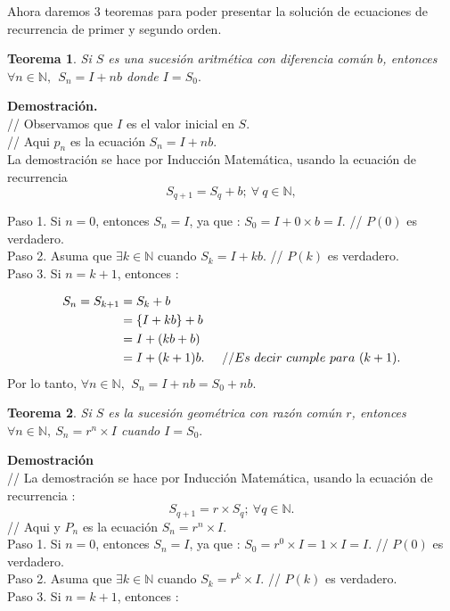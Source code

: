 \documentclass[11pt,a4paper]{article}
\newtheorem{teo}{Teorema}{}
\begin{document}
Ahora daremos 3 teoremas para poder presentar la solución de ecuaciones de recurrencia de primer y segundo orden.\\
\begin{teo}
Si $S$ es una sucesión aritmética con diferencia común $b$, entonces $\forall n \in \mathbb{N},~~ S_{n} = I +nb$ donde $I = S_{0}.$
\end{teo}
\textbf{Demostración.}\\
// Observamos que $I$ es el valor inicial en $S$.\\
// Aqui $p_{n}$ es la ecuación $S_{n} = I + nb.$\\

La demostración se hace por Inducción Matemática, usando la ecuación de recurrencia $$S_{q+1} = S_{q} + b; ~ \forall ~q \in \mathbb{N},$$

Paso 1. Si $n = 0$, entonces $S_{n} = I$, ya que : $S_{0} = I + 0 \times b = I.$ \hspace*{1cm} // $P(0)$ es verdadero.\\
\hspace*{0.5cm} Paso 2. Asuma que $\exists k \in \mathbb{N}$ cuando $S_{k} = I + kb.$ \hspace*{3,4cm} // $P(k)$ es verdadero.\\
\hspace*{0.5cm} Paso 3. Si $n = k + 1$, entonces : 

\begin{align*}
S_{n} = S_{k+1} &= S_{k} + b \\
				&= \{I + kb\} + b \\
				&= I +(kb +b)\\
				&= I +(k+1)b. \hspace{0.5cm} //Es~ decir ~cumple ~para~ (k+1).
\end{align*}
Por lo tanto, $\forall n \in \mathbb{N}$, $~S_{n} = I + nb = S_{0} + nb.$

\begin{teo}
Si $S$ es la sucesión geométrica con razón común $r$, entonces $\forall n \in \mathbb{N},~ S_{n} = r^{n} \times I$ cuando $I = S_{0}.$ 
\end{teo}
\textbf{Demostración}\\
// La demostración se hace por Inducción Matemática, usando la ecuación de recurrencia : $$ S_{q+1} = r \times S_{q}; ~ \forall q \in \mathbb{N}.$$
// Aqui y $P_{n}$ es la ecuación $S_{n} = r^{n} \times I.$\\

Paso 1. Si $n = 0$, entonces $S_{n} = I$, ya que : $S_{0} = r^{0} \times I = 1 \times I = I.$ \hspace*{1cm} // $P(0)$ es verdadero.\\
\hspace*{0.5cm} Paso 2. Asuma que $\exists k \in \mathbb{N}$ cuando $S_{k} = r^{k} \times I.$ \hspace*{4,3cm} // $P(k)$ es verdadero.\\
\hspace*{0.5cm} Paso 3. Si $n = k + 1$, entonces : 
\end{document}
